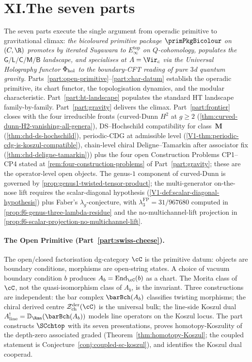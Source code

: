 \section*{XI.\quad The seven parts}

The seven parts execute the single argument from operadic
primitive to gravitational climax: \emph{the bicoloured primitive
package $\primPkgBicolour$ on $(C, \R)$ promotes by iterated
Sugawara to $E_\infty^{\mathrm{top}}$ on $Q$-cohomology, populates
the $\mathsf{G/L/C/M/B}$ landscape, and specialises at
$A = \Vir_c$ via the Universal Holography functor $\Phi_{\mathrm{hol}}$ to
the boundary-CFT reading of pure $3$d quantum gravity.}
Parts~\ref{part:open-primitive}--\ref{part:char-datum} establish
the operadic primitive, its chart functor, the topologisation
dynamics, and the modular characteristic.
Part~\ref{part:ht-landscape} populates the standard HT landscape
family-by-family. Part~\ref{part:gravity} delivers the climax.
Part~\ref{part:frontier} closes with the four irreducible
fronts (curved-Dunn $H^2$ at $g \ge 2$
\textup{(}\cref{thm:curved-dunn-H2-vanishing-all-genera}\textup{)},
DS--Hochschild compatibility for class~$\mathbf{M}$
\textup{(}\cref{thm:chd-ds-hochschild}\textup{)}, periodic-CDG at
admissible level
\textup{(}\cref{V1-thm:periodic-cdg-is-koszul-compatible}\textup{)},
chain-level chiral Deligne--Tamarkin after associator fix
\textup{(}\cref{thm:chd-deligne-tamarkin}\textup{)}\textup{)} plus
the four open Construction Problems
CP1--CP4 stated at \cref{rem:four-construction-problems}
of Part~\ref{part:gravity}; these are the operator-level
open objects. The genus-$1$ component
of curved-Dunn is governed by
\cref{prop:genus1-twisted-tensor-product}; the multi-generator
on-the-nose lift requires the scalar-diagonal hypothesis
\textup{(}\cref{V1-def:scalar-diagonal-hypothesis}\textup{)} plus
Faber's $\lambda_g$-conjecture, with
$\lambda_3^{\mathrm{FP}} = 31/967680$ computed in
\cref{prop:f6-genus-three-lambda-residue} and the no-multichannel-lift
projection in \cref{prop:f6-scalar-projection-no-multichannel-lift}.

\paragraph{The Open Primitive (Part~\ref{part:swiss-cheese}).}
The open/closed factorisation dg-category $\cC$ is the primitive
datum: objects are boundary conditions, morphisms are open-string
states. A choice of vacuum boundary condition $b$ produces
$A_b = \operatorname{End}_\cC(b)$ as a chart. The Morita class
of $\cC$, not the quasi-isomorphism class of $A_b$, is the
invariant. Three constructions are independent: the bar complex
$\barBch(A_b)$ classifies twisting morphisms; the chiral derived
centre $\cZ^{\mathrm{der}}_{\mathrm{ch}}(\cC)$ is the universal
bulk; the line-side Koszul dual
$A^!_{\mathrm{line}} = \mathbb{D}_{\Ran}(\barBch(A_b))$ models
line operators on the Koszul locus. The part constructs
$\SCchtop$ with its seven presentations, proves
homotopy-Koszulity of the depth-zero associated graded
(Theorem~\ref{thm:homotopy-Koszul}; the coupled statement is
Conjecture~\ref{conj:coupled-sc-koszul}), and identifies the Koszul
dual cooperad.

